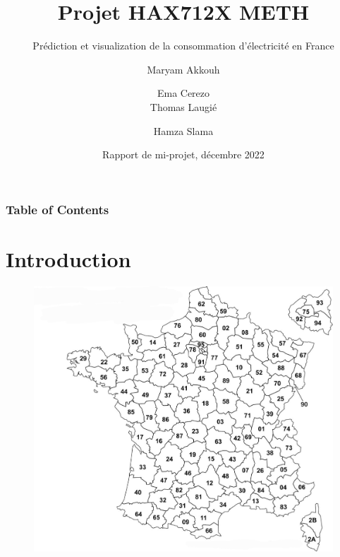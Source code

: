 \documentclass[compress, red]{beamer}
\title[Projet HAX712X] %
{Projet HAX712X METH}
\subtitle{Prédiction et visualization de la consommation d'électricité en France}
\author[M. Akkouh, E. Cerezo, T. Laugié, H. Slama] %
{Maryam Akkouh \and Ema Cerezo\\ Thomas Laugié \and Hamza Slama}
\date[VLC 2021] %
{Rapport de mi-projet, décembre 2022}
\begin{document}
\frame{\titlepage}

\begin{frame}
\frametitle{Table of Contents}
\tableofcontents
\end{frame}


\section{Introduction}
\begin{frame}
\begin{figure}[h!]
	\begin{minipage}[b]{0.01\linewidth}
	  \includegraphics[scale=0.1]{images/Image (1)-1.jpg}
	\end{minipage}\hfill
	\begin{minipage}[b]{0.4\linewidth}	

\end{minipage}
\end{figure}
\end{frame}
\end{document}
